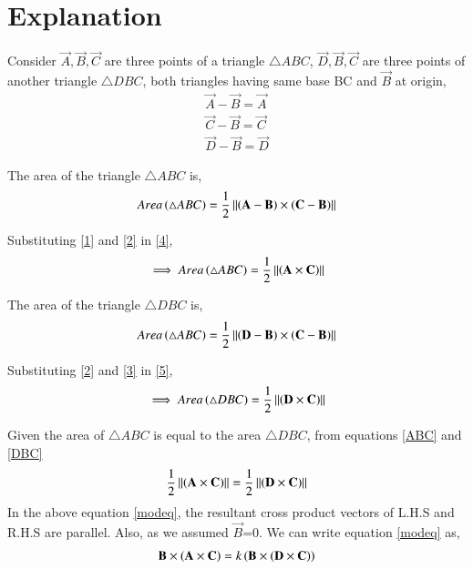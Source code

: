 \documentclass[journal,12pt,twocolumn]{IEEEtran}
\begin{document}
\section{Explanation}
\item Consider $\vec{A},\vec{B},\vec{C}$ are three points of a triangle $\triangle ABC$, $\vec{D}, \vec{B}, \vec{C}$ are three points of another triangle $\triangle DBC$, both triangles having same base BC and $\vec{B}$ at origin, 
\begin{align}
    \label{1}
    \vec{A}-\vec{B}=\vec{A}\\
    \label{2}
    \vec{C}-\vec{B}=\vec{C}\\
    \label{3}
    \vec{D}-\vec{B}=\vec{D}
\end{align}
\item The area of the triangle $\triangle ABC$ is,
\begin{align}
    \label{4}
    Area\left(\triangle ABC\right) = \frac{1}{2}\left\lVert\left(\mathbf{A} - \mathbf{B}\right) \times (\mathbf{C} - \mathbf{B})\right\rVert
\end{align}
\item Substituting \eqref{1} and \eqref{2} in \eqref{4}, 
\begin{align}
    \label{ABC}
    \implies Area\left(\triangle ABC\right) = \frac{1}{2}\left\lVert\left(\mathbf{A} \times \mathbf{C}\right)\right\rVert
\end{align}
\item The area of the triangle $\triangle DBC$ is,
\begin{align}
    \label{5}
    Area\left(\triangle ABC\right) = \frac{1}{2}\left\lVert\left(\mathbf{D} - \mathbf{B}\right) \times \left(\mathbf{C} - \mathbf{B}\right)\right\rVert
\end{align}   
\item Substituting \eqref{2} and \eqref{3} in \eqref{5}, 
\begin{align}
    \label{DBC}
    \implies Area\left(\triangle DBC\right) = \frac{1}{2}\left\lVert\left(\mathbf{D} \times \mathbf{C}\right)\right\rVert
\end{align}
\item Given the area of $\triangle ABC$ is equal to the area $\triangle DBC$, from equations \eqref{ABC} and \eqref{DBC}
\begin{align}
    \label{modeq}
    \frac{1}{2}\left\lVert\left(\mathbf{A} \times \mathbf{C}\right)\right\rVert = \frac{1}{2}\left\lVert\left(\mathbf{D} \times \mathbf{C}\right)\right\rVert
\end{align}
In the above equation \eqref{modeq}, the resultant cross product vectors of L.H.S and R.H.S are parallel. Also, as we assumed $\vec{B}$=0. We can write equation \eqref{modeq} as,
\begin{align}
    \mathbf{B} \times \left(\mathbf{A} \times \mathbf{C}\right) = k \left(\mathbf{B} \times \left(\mathbf{D}\times \mathbf{C}\right)\right)
\end{align}
\end{document}
